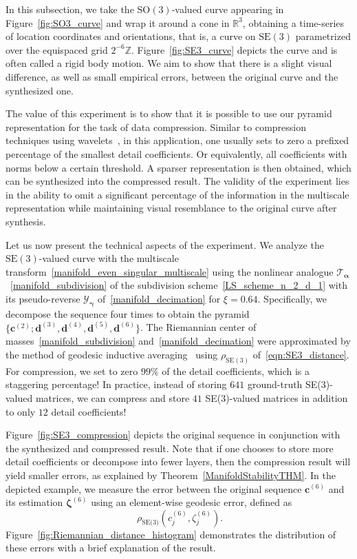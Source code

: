 \documentclass[12pt]{article}
\begin{document}
In this subsection, we take the $\text{SO}(3)$-valued curve appearing in Figure~\ref{fig:SO3_curve} and wrap it around a cone in $\mathbb{R}^3$, obtaining a time-series of location coordinates and orientations, that is, a curve on $\text{SE}(3)$ parametrized over the equispaced grid $2^{-6}\mathbb{Z}$. Figure~\ref{fig:SE3_curve} depicts the curve and is often called a rigid body motion. We aim to show that there is a slight visual difference, as well as small empirical errors, between the original curve and the synthesized one.

The value of this experiment is to show that it is possible to use our pyramid representation for the task of data compression. Similar to compression techniques using wavelets~\cite{ning2010wavelet}, in this application, one usually sets to zero a prefixed percentage of the smallest detail coefficients. Or equivalently, all coefficients with norms below a certain threshold. A sparser representation is then obtained, which can be synthesized into the compressed result. The validity of the experiment lies in the ability to omit a significant percentage of the information in the multiscale representation while maintaining visual resemblance to the original curve after synthesis.

Let us now present the technical aspects of the experiment. We analyze the $\text{SE}(3)$-valued curve with the multiscale transform~\eqref{manifold_even_singular_multiscale} using the nonlinear analogue $\mathcal{T}_{\boldsymbol{\alpha}}$~\eqref{manifold_subdivision} of the subdivision scheme~\eqref{LS_scheme_n_2_d_1} with its pseudo-reverse $\mathcal{Y}_{\boldsymbol{\gamma}}$ of~\eqref{manifold_decimation} for $\xi=0.64$. Specifically, we decompose the sequence four times to obtain the pyramid $\{ \boldsymbol{c}^{(2)}; \boldsymbol{d}^{(3)}, \boldsymbol{d}^{(4)}, \boldsymbol{d}^{(5)},\boldsymbol{d}^{(6)}\}$. The Riemannian center of masses~\eqref{manifold_subdivision} and~\eqref{manifold_decimation} were approximated by the method of geodesic inductive averaging~\cite{dyn2017manifold} using $\rho_{\text{SE}(3)}$ of~\eqref{eqn:SE3_distance}. For compression, we set to zero $99\%$ of the detail coefficients, which is a staggering percentage! In practice, instead of storing $641$ ground-truth SE(3)-valued matrices, we can compress and store $41$ SE(3)-valued matrices in addition to only $12$ detail coefficients!

Figure~\ref{fig:SE3_compression} depicts the original sequence in conjunction with the synthesized and compressed result. Note that if one chooses to store more detail coefficients or decompose into fewer layers, then the compression result will yield smaller errors, as explained by Theorem~\ref{ManifoldStabilityTHM}. In the depicted example, we measure the error between the original sequence $\boldsymbol{c}^{(6)}$ and its estimation $\boldsymbol{\zeta}^{(6)}$ using an element-wise geodesic error, defined as 
\begin{equation}~\label{eqn:geodesic_error}
    \rho_{\text{SE(3)}}(c^{(6)}_j,\zeta^{(6)}_j).
\end{equation}
Figure~\ref{fig:Riemannian_distance_histogram} demonstrates the distribution of these errors with a brief explanation of the result.
\end{document}
